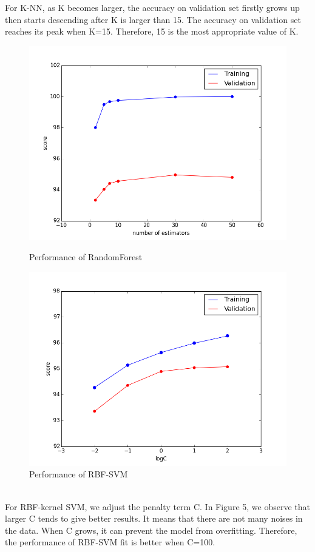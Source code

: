 \documentclass{article} %
\begin{document}
For K-NN, as K becomes larger, the accuracy on validation set firstly grows up then starts descending after K is larger than 15. The accuracy on validation set reaches its peak when K=15. Therefore, 15 is the most appropriate value of K.\\
\begin{figure}[htbp]
\centering
\begin{minipage}{2.65in}
\centering
\includegraphics[width=1.1\textwidth]{4.png}
\caption{Performance of RandomForest}
\end{minipage}
\begin{minipage}{2.65in}
\centering
\includegraphics[width=1.1\textwidth]{5.png}
\caption{Performance of RBF-SVM}
\end{minipage}
\end{figure}
\\
For RBF-kernel SVM, we adjust the penalty term C. In Figure 5, we observe that larger C tends to give better results. It means that there are not many noises in the data. When C grows, it can prevent the model from overfitting. Therefore, the performance of RBF-SVM fit is better when C=100.\\
\end{document}
